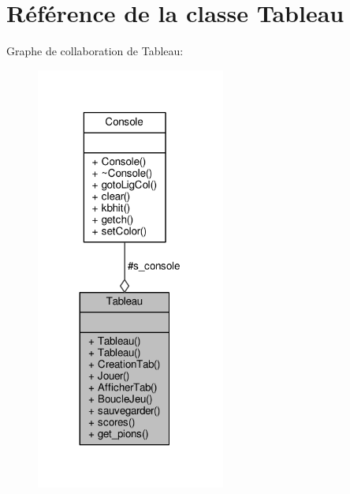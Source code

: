 \hypertarget{classTableau}{}\section{Référence de la classe Tableau}
\label{classTableau}


Graphe de collaboration de Tableau\+:\nopagebreak
\begin{figure}[H]
\begin{center}
\leavevmode
\includegraphics[width=176pt]{classTableau__coll__graph}
\end{center}
\end{figure}
